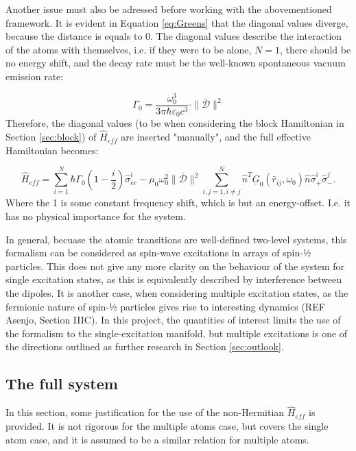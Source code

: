 \documentclass{article}
\begin{document}
Another issue must also be adressed before working with the abovementioned framework. It is evident in Equation \ref{eq:Greens} that the diagonal values diverge, because the distance is equals to 0. The diagonal values describe the interaction of the atoms with themselves, i.e. if they were to be alone, $N = 1$, there should be no energy shift, and the decay rate must be the well-known spontaneous vacuum emission rate:

\begin{equation}\label{eq:vac_emission_rate}
    \Gamma_0 = \frac{\omega_0^3}{3\pi \hbar \varepsilon_0 c^3} \cdot \|\bar{\mathscr{D}}\|^2
\end{equation}
Therefore, the diagonal values (to be when considering the block Hamiltonian in Section \ref{sec:block}) of $\hat{H}_{eff}$ are inserted "manually", and the full effective Hamiltonian becomes:

\begin{equation}
    \hat{H}_{eff} = \sum_{i=1}^N \hbar \Gamma_0 \left( 1 - \frac{i}{2} \right) \hat{\sigma}_{ee}^i -\mu_0 \omega_0^2 \|\bar{\mathscr{D}}\|^2 \sum_{i,j = 1, i \neq j}^N \hat{n}^T \underline{G}_0(\bar{r}_{ij}, \omega_0) \hat{n} \hat{\sigma}_+^i \hat{\sigma}_-^j.
\end{equation}
Where the 1 is some constant frequency shift, which is but an energy-offset. I.e. it has no physical importance for the system. 

In general, becuase the atomic transitions are well-defined two-level systems, this formalism can be considered as spin-wave excitations in arrays of spin-½ particles. This does not give any more clarity on the behaviour of the system for single excitation states, as this is equivalently described by interference between the dipoles. It is another case, when considering multiple excitation states, as the fermionic nature of spin-½ particles gives rise to interesting dynamics (REF Asenjo, Section IIIC). In this project, the quantities of interest limits the use of the formalism to the single-excitation manifold, but multiple excitations is one of the directions outlined as further research in Section \ref{sec:outlook}. 

\subsection{The full system}\label{sec:full_system}
In this section, some justification for the use of the non-Hermitian $\hat{H}_{eff}$ is provided. It is not rigorous for the multiple atoms case, but covers the single atom case, and it is assumed to be a similar relation for multiple atoms. 
\end{document}
